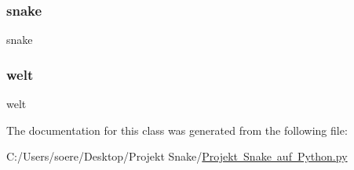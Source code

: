 \subsubsection{\texorpdfstring{snake}{snake}}
{\footnotesize\ttfamily snake}

\mbox{\label{class_projekt_01_snake_01auf_01_python_1_1_snake__spiel_a80417409ca56d97eabc593c02dbb4a1c}} 
\subsubsection{\texorpdfstring{welt}{welt}}
{\footnotesize\ttfamily welt}



The documentation for this class was generated from the following file\+:\begin{DoxyCompactItemize}
\item 
C\+:/\+Users/soere/\+Desktop/\+Projekt Snake/\mbox{\hyperlink{_projekt_01_snake_01auf_01_python_8py}{Projekt Snake auf Python.\+py}}\end{DoxyCompactItemize}
